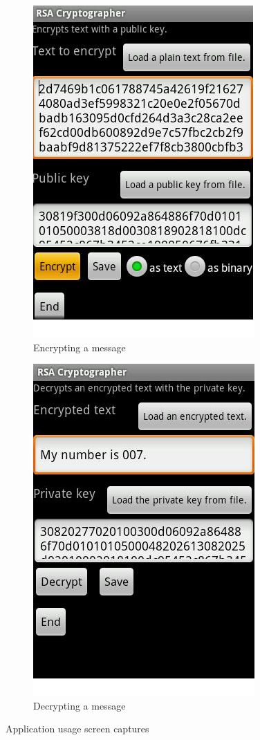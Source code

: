 \documentclass[a4paper,12pt]{report}
\begin{document}
\begin{figure}
        \centering
        \begin{subfigure}[b]{0.45\textwidth}
                \centering
                \includegraphics[scale=0.5]{images/cat2.jpg}
                \caption{Encrypting a message}
                \label{fig:cat2}
        \end{subfigure}
	\begin{subfigure}[b]{0.45\textwidth}
                \centering
                \includegraphics[scale=0.5]{images/cat1.jpg}
                \caption{Decrypting a message}
                \label{fig:cat1}
        \end{subfigure}
        \caption{Application usage screen captures}\label{fig:ciphercat}
\end{figure}
\end{document}
